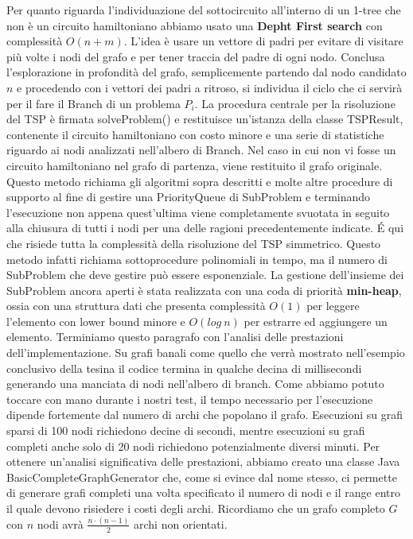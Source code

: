 \documentclass[
	article,			%
	12pt,				%
	oneside,			%
	a4paper,			%
	english,			%
	italian,				%
	sumario=tradicional,
	]{abntex2}
\begin{document}
\newline
\newline
Per quanto riguarda l'individuazione del sottocircuito all'interno di un 1-tree che non è un circuito hamiltoniano abbiamo usato una \textbf{Depht First search} con complessità $O(n+m)$. L'idea è usare un vettore di padri per evitare di visitare più volte i nodi del grafo e per tener traccia del padre di ogni nodo. Conclusa l'esplorazione in profondità del grafo, semplicemente partendo dal nodo candidato $n$ e procedendo con i vettori dei padri a ritroso, si individua il ciclo che ci servirà per il fare il Branch di un problema $P_i$.
\newline
\newline
La procedura centrale per la risoluzione del TSP è firmata  {\selectfont solveProblem()} e restituisce un'istanza della classe {\selectfont TSPResult}, contenente il circuito hamiltoniano con costo minore e una serie di statistiche riguardo ai nodi analizzati nell'albero di Branch. Nel caso in cui non vi fosse un circuito hamiltoniano nel grafo di partenza, viene restituito il grafo originale. Questo metodo richiama gli algoritmi sopra descritti e molte altre procedure di supporto al fine di gestire una {\selectfont PriorityQueue} di {\selectfont SubProblem} e terminando l'esecuzione non appena quest'ultima viene completamente svuotata in seguito alla chiusura di tutti i nodi per una delle ragioni precedentemente indicate. \'E qui che risiede tutta la complessità della risoluzione del TSP simmetrico. Questo metodo infatti richiama sottoprocedure polinomiali in tempo, ma il numero di {\selectfont SubProblem} che deve gestire può essere esponenziale.
\newline
La gestione dell'insieme dei SubProblem ancora aperti è stata realizzata con una coda di priorità \textbf{min-heap}, ossia con una struttura dati che presenta complessità $O(1)$ per leggere l'elemento con lower bound minore e $O(log\:n)$ per estrarre ed aggiungere un elemento.
\newline
\newline
Terminiamo questo paragrafo con l'analisi delle prestazioni dell'implementazione. Su grafi banali come quello che verrà mostrato nell'esempio conclusivo della tesina il codice termina in qualche decina di millisecondi generando una manciata di nodi nell'albero di branch.\newline
Come abbiamo potuto toccare con mano durante i nostri test, il tempo necessario per l'esecuzione dipende fortemente dal numero di archi che popolano il grafo. Esecuzioni su grafi sparsi di 100 nodi richiedono decine di secondi, mentre esecuzioni su grafi completi anche solo di 20 nodi richiedono potenzialmente diversi minuti. Per ottenere un'analisi significativa delle prestazioni, abbiamo creato una classe Java {\selectfont BasicCompleteGraphGenerator} che, come si evince dal nome stesso, ci permette di generare grafi completi una volta specificato il numero di nodi e il range entro il quale devono risiedere i costi degli archi. Ricordiamo che un grafo completo $G$ con $n$ nodi avrà $\frac{n\cdot (n-1)}{2}$ archi non orientati.\newline
\end{document}
